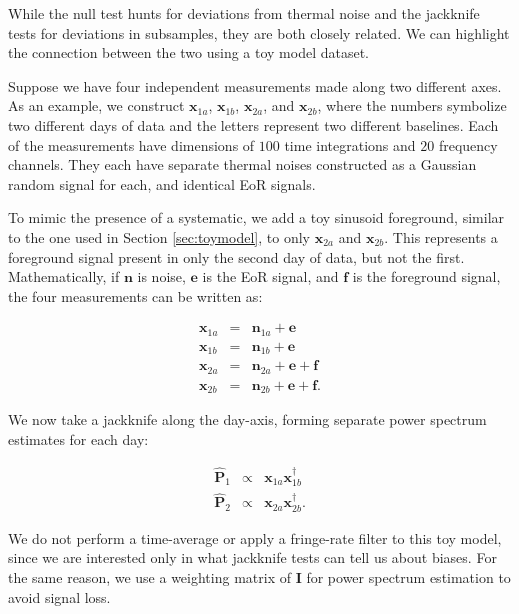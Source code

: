 \documentclass[preprint2,numberedappendix,tighten]{aastex6}  %
\begin{document}
While the null test hunts for deviations from thermal noise and the jackknife tests for deviations in subsamples, they are both 
closely related. We can highlight the connection between the two using a toy model dataset.

Suppose we have four independent measurements made along two different axes. As an example, we construct $\textbf{x}_{1a}$, $\textbf{x}_{1b}$, $\textbf{x}_{2a}$, and $\textbf{x}_{2b}$, where the numbers symbolize two different days of data and the letters represent two different baselines. Each of the 
measurements have dimensions of $100$ time integrations and $20$ frequency channels. They each have separate thermal 
noises constructed as a Gaussian random signal for each, and identical EoR signals. 

To mimic the presence of a systematic, we add a toy sinusoid foreground, similar to the one used in 
Section \ref{sec:toymodel}, to only $\textbf{x}_{2a}$ and $\textbf{x}_{2b}$. This represents a foreground signal 
present in only the second day of data, but not the first. Mathematically, if  $\textbf{n}$ 
is noise, $\textbf{e}$ is the EoR signal, and $\textbf{f}$ is the foreground signal, the four measurements can be written as:

\begin{eqnarray}
\label{eq:bias1}
\textbf{x}_{1a} &=& \textbf{n}_{1a} + \textbf{e}  \\ 
\textbf{x}_{1b} &=& \textbf{n}_{1b} + \textbf{e}  \\ 
\textbf{x}_{2a} &=& \textbf{n}_{2a} + \textbf{e} + \textbf{f} \\ 
\textbf{x}_{2b} &=& \textbf{n}_{2b} + \textbf{e} + \textbf{f}.
\end{eqnarray} 

\noindent We now take a jackknife along the day-axis, forming separate power spectrum estimates for each day:

\begin{eqnarray}
\widehat{\textbf{P}}_{1} &\propto& \textbf{x}_{1a}\textbf{x}_{1b}^{\dagger} \\
\widehat{\textbf{P}}_{2} &\propto& \textbf{x}_{2a}\textbf{x}_{2b}^{\dagger}.
\end{eqnarray}

We do not perform a time-average or apply a fringe-rate filter to this toy model, since we are interested only in what jackknife 
tests can tell us about biases. For the same reason, we use a weighting matrix of $\textbf{I}$ for power spectrum estimation to 
avoid signal loss. 
\end{document}
